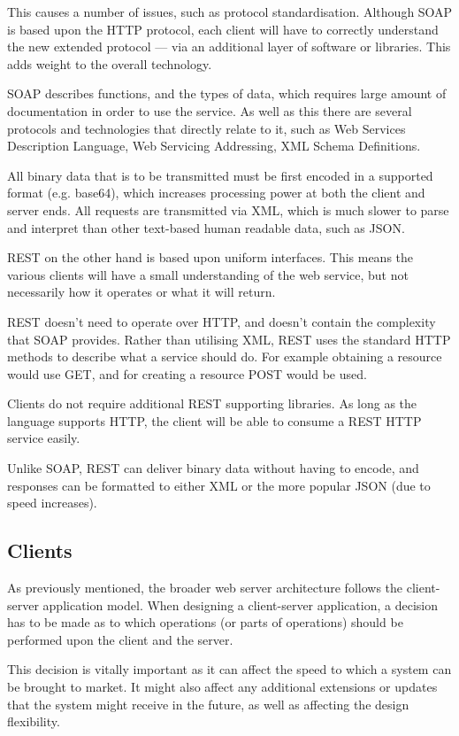 This causes a number of issues, such as protocol standardisation. Although SOAP
is based upon the HTTP protocol, each client will have to correctly understand 
the new extended protocol --- via an additional layer of software or libraries.
This adds weight to the overall technology.

SOAP describes functions, and the types of data, which requires large amount of
documentation in order to use the service. As well as this there are several 
protocols and technologies that directly relate to it, such as Web Services 
Description Language, Web Servicing Addressing, XML Schema Definitions.

All binary data that is to be transmitted must be first encoded in a supported
format (e.g. base64), which increases processing power at both the client and
server ends. All requests are transmitted via XML, which is much slower to
parse and interpret than other text-based human readable data, such as JSON.

REST on the other hand is based upon uniform interfaces. This means the various
clients will have a small understanding of the web service, but not necessarily
how it operates or what it will return.

REST doesn't need to operate over HTTP, and doesn't contain the complexity that
SOAP provides. Rather than utilising XML, REST uses the standard HTTP methods
to describe what a service should do. For example obtaining a resource would
use GET, and for creating a resource POST would be used.

Clients do not require additional REST supporting libraries. As long as the
language supports HTTP, the client will be able to consume a REST HTTP service
easily.

Unlike SOAP, REST can deliver binary data without having to encode, and
responses can be formatted to either XML or the more popular JSON (due to speed
increases). 


\subsection{Clients}

As previously mentioned, the broader web server architecture follows the 
client-server application model. When designing a client-server application, a
decision has to be made as to which operations (or parts of operations) should
be performed upon the client and the server.

This decision is vitally important as it can affect the speed to which a system
can be brought to market. It might also affect any additional extensions or
updates that the system might receive in the future, as well as affecting the
design flexibility.


